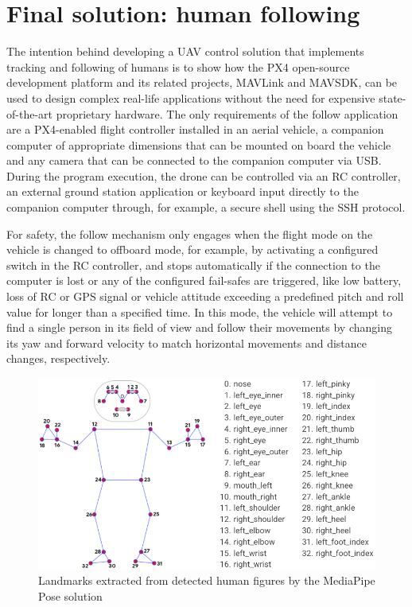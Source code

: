  
\section{Final solution: human following}
\label{sec:follow}

The intention behind developing a UAV control solution that implements tracking and following of humans is to show how the PX4 open-source development platform and its related projects, MAVLink and MAVSDK, can be used to design complex real-life applications without the need for expensive state-of-the-art proprietary hardware.
The only requirements of the follow application are a PX4-enabled flight controller installed in an aerial vehicle, a companion computer of appropriate dimensions that can be mounted on board the vehicle and any camera that can be connected to the companion computer via USB.
During the program execution, the drone can be controlled via an RC controller, an external ground station application or keyboard input directly to the companion computer through, for example, a secure shell using the SSH protocol.

For safety, the follow mechanism only engages when the flight mode on the vehicle is changed to offboard mode, for example, by activating a configured switch in the RC controller, and stops automatically if the connection to the computer is lost or any of the configured fail-safes are triggered, like low battery, loss of RC or GPS signal or vehicle attitude exceeding a predefined pitch and roll value for longer than a specified time.
In this mode, the vehicle will attempt to find a single person in its field of view and follow their movements by changing its yaw and forward velocity to match horizontal movements and distance changes, respectively.

\begin{figure}
  \centering
  \includegraphics[width=\textwidth, keepaspectratio]{img/pose-landmarks.png}
  \caption{Landmarks extracted from detected human figures by the MediaPipe Pose solution}
  \label{fig:pose-landmarks}
\end{figure}

